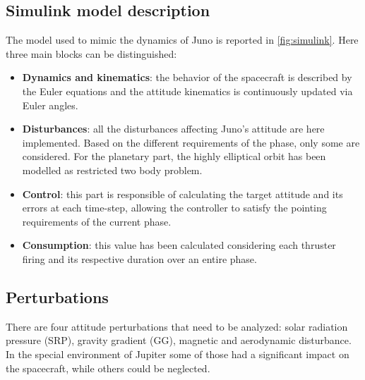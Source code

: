 \subsection{Simulink model description}
\label{subsec:simulink}


The model used to mimic the dynamics of Juno is reported in \autoref{fig:simulink}. Here three main blocks can be distinguished:

\begin{itemize}
    \item \textbf{Dynamics and kinematics}: the behavior of the spacecraft is described by the Euler equations and the attitude kinematics is continuously updated via Euler angles. 
    \item \textbf{Disturbances}: all the disturbances affecting Juno's attitude are here implemented. Based on the different requirements of the phase, only some are considered. For the planetary part, the highly elliptical orbit has been modelled as restricted two body problem. 
    \item \textbf{Control}: this part is responsible of calculating the target attitude and its errors at each time-step, allowing the controller to satisfy the pointing requirements of the current phase. 
    \item \textbf{Consumption}: this value has been calculated considering each thruster firing and its respective duration over an entire phase. 
    
\end{itemize}

\subsection{Perturbations}
\label{subsec:perturbations}

There are four attitude perturbations that need to be analyzed: solar radiation pressure (SRP), gravity gradient (GG), magnetic and aerodynamic disturbance. In the special environment of Jupiter some of those had a significant impact on the spacecraft, while others could be neglected. 

